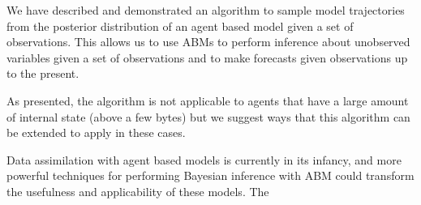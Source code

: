 \documentclass{article}
\begin{document}
We have described and demonstrated an algorithm to sample model trajectories from the posterior distribution of an agent based model given a set of observations. This allows us to use ABMs to perform inference about unobserved variables given a set of observations and to make forecasts given observations up to the present.

As presented, the algorithm is not applicable to agents that have a large amount of internal state (above a few bytes) but we suggest ways that this algorithm can be extended to apply in these cases.

Data assimilation with agent based models is currently in its infancy, and more powerful techniques for performing Bayesian inference with ABM could transform the usefulness and applicability of these models. The 

%
% 


\end{document}
